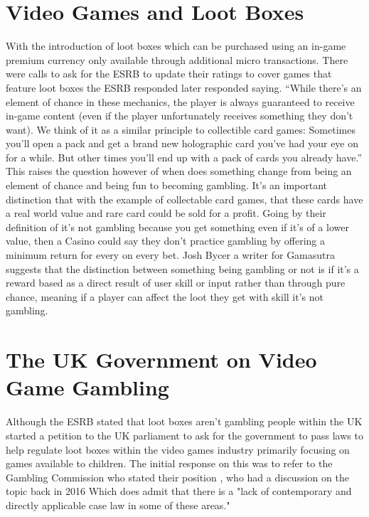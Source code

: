 \documentclass{scrartcl}
\begin{document}
\section{Video Games and Loot Boxes}

With the introduction of loot boxes which can be purchased using an in-game premium currency only available through additional micro transactions. There were calls to ask for the ESRB to update their ratings to cover games that feature loot boxes the ESRB responded later responded saying. “While there’s an element of chance in these mechanics, the player is always guaranteed to receive in-game content (even if the player unfortunately receives something they don’t want). We think of it as a similar principle to collectible card games: Sometimes you’ll open a pack and get a brand new holographic card you’ve had your eye on for a while. But other times you’ll end up with a pack of cards you already have.” \cite{Jason2017ESRB} This raises the question however of when does something change from being an element of chance and being fun to becoming gambling. It's an important distinction that with the example of collectable card games, that these cards have a real world value and rare card could be sold for a profit. Going by their definition of it's not gambling because you get something even if it's of a lower value, then a Casino could say they don't practice gambling by offering a minimum return for every on every bet. Josh Bycer a writer for Gamasutra \cite{Josh2017Loot} suggests that the distinction between something being gambling or not is if it's a reward based as a direct result of user skill or input rather than through pure chance, meaning if a player can affect the loot they get with skill it's not gambling.

\section{The UK Government on Video Game Gambling}
Although the ESRB stated that loot boxes aren't gambling people within the UK started a petition to the UK parliament to ask for the government to pass laws to help regulate loot boxes within the video games industry primarily focusing on games available to children. The initial response on this was to refer to the Gambling Commission who stated their position \cite{GamCom2017position}, who had a discussion on the topic back in 2016 \cite{GamCom2016discussion} Which does admit that there is a "lack of contemporary and directly applicable case law in some of these areas." 
\end{document}
